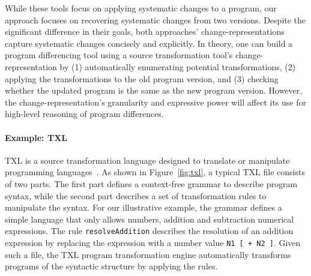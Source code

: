 \documentclass[runningheads,a4paper]{llncs}
\newcommand{\codefont}[1]{\footnotesize{\texttt{#1}}\normalsize}
\begin{document}
While these tools focus on applying systematic changes to a program, our approach focuses on recovering systematic changes from two versions. 
Despite the significant difference in their goals, both approaches' change-representations capture systematic changes concisely and explicitly. In theory, one can build a program differencing tool using a source transformation tool's change-representation by (1) automatically enumerating potential transformations, (2) applying the transformations to the old program version, and (3) checking whether the updated program is the same as the new program version. 
However, the change-representation's granularity and expressive power will affect its use for high-level reasoning of program differences. 

\paragraph{\textbf{Example: TXL}} 
TXL is a source transformation language designed to translate or manipulate programming languages~\cite{Cordy2006}. As shown in Figure~\ref{fig:txl}, a typical TXL file consists of two parts. The first part defines a context-free grammar to describe program syntax, while the second part describes a set of transformation rules to manipulate the syntax. For our illustrative example, the grammar defines a simple language that only allows numbers, addition and subtraction numerical expressions. The rule \codefont{resolveAddition} describes the resolution of an addition expression by replacing the expression with a number value \codefont{N1 [ + N2 ]}. Given such a file, the TXL program transformation engine automatically transforms programs of the syntactic structure by applying the rules. 
\end{document}
